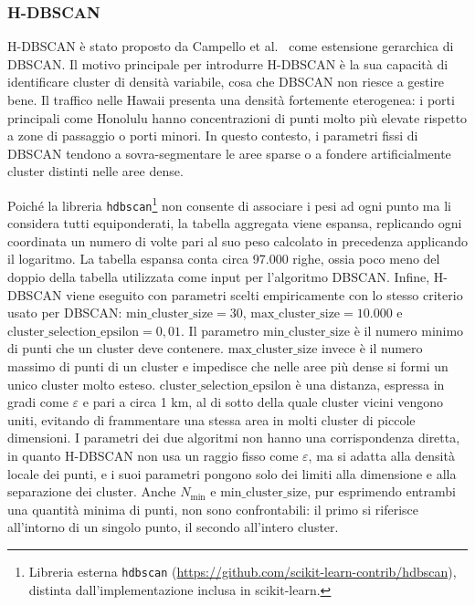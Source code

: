 \subsubsection{H-DBSCAN}
 
H-DBSCAN è stato proposto da Campello et al.~\cite{campello2013} come estensione gerarchica di DBSCAN.
Il motivo principale per introdurre H-DBSCAN è la sua capacità di identificare cluster di densità variabile, cosa che DBSCAN non 
riesce a gestire bene. 
Il traffico nelle Hawaii presenta una densità fortemente eterogenea: i porti principali come Honolulu hanno concentrazioni 
di punti molto più elevate rispetto a zone di passaggio o porti minori. 
In questo contesto, i parametri fissi di DBSCAN tendono a sovra-segmentare le aree sparse o a fondere artificialmente cluster distinti 
nelle aree dense.
 
Poiché la libreria \texttt{hdbscan}\footnote{Libreria esterna \texttt{hdbscan} (\url{https://github.com/scikit-learn-contrib/hdbscan}), 
distinta dall'implementazione inclusa in scikit-learn.} non consente di associare i pesi ad ogni punto ma li considera tutti equiponderati, 
la tabella aggregata viene espansa, replicando ogni coordinata un numero di volte pari al suo peso calcolato in precedenza applicando il logaritmo. 
La tabella espansa conta circa 97.000 righe, ossia poco meno del doppio della tabella utilizzata come input per l'algoritmo DBSCAN\@. 
Infine, H-DBSCAN viene eseguito con parametri scelti empiricamente con lo stesso criterio usato per DBSCAN:
$\text{min\_cluster\_size} = 30$, $\text{max\_cluster\_size} = 10.000$ e $\text{cluster\_selection\_epsilon} = 0{,}01$.
Il parametro $\text{min\_cluster\_size}$ è il numero minimo di punti che un cluster deve contenere.
$\text{max\_cluster\_size}$ invece è il numero massimo di punti di un cluster
e impedisce che nelle aree più dense si formi un unico cluster molto esteso. $\text{cluster\_selection\_epsilon}$ è
una distanza, espressa in gradi come $\varepsilon$ e pari a circa 1 km, al di sotto della quale cluster vicini vengono
uniti, evitando di frammentare una stessa area in molti cluster di piccole dimensioni.
I parametri dei due algoritmi non hanno una corrispondenza diretta, in quanto H-DBSCAN non usa un raggio fisso come
$\varepsilon$, ma si adatta alla densità locale dei punti, e i suoi parametri pongono solo dei limiti alla dimensione
e alla separazione dei cluster. Anche $N_{\min}$ e $\text{min\_cluster\_size}$, pur esprimendo entrambi una quantità
minima di punti, non sono confrontabili: il primo si riferisce all'intorno di un singolo punto, il secondo
all'intero cluster.

